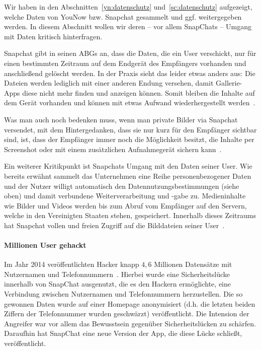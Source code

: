 Wir haben in den Abschnitten~\ref{yn:datenschutz} und~\ref{sc:datenschutz}
aufgezeigt, welche Daten von YouNow bzw. Snapchat gesammelt und ggf.
weitergegeben werden. In diesem Abschnitt wollen wir deren -- vor allem
SnapChats --  Umgang mit Daten kritisch hinterfragen.

Snapchat gibt in seinen ABGs an, dass die Daten, die ein User verschickt, nur
f\"ur einen bestimmten Zeitraum auf dem Endger\"at des Empf\"angers vorhanden
und anschlie{\ss}end gel\"oscht werden. In der Praxis sieht das leider etwas
anders aus: Die Dateien werden lediglich mit einer anderen Endung versehen,
damit Gallerie-Apps diese nicht mehr finden und anzeigen k\"onnen. Somit
bleiben die Inhalte auf dem Ger\"at vorhanden und k\"onnen mit etwas Aufwand
wiederhergestellt werden~\cite{sc_risiken}.

Was man auch noch bedenken muss, wenn man private Bilder via Snapchat
versendet, mit dem Hintergedanken, dass sie nur kurz f\"ur den Empf\"anger
sichtbar sind, ist, dass der Empf\"anger immer noch die M\"oglichkeit besitzt,
die Inhalte per Screenshot oder mit einem zus\"atzlichen Aufnahmeger\"at
sichern kann~\cite{sc_risiken}.

Ein weiterer Kritikpunkt ist Snapchats Umgang mit den Daten seiner User. Wie
bereits erw\"ahnt sammelt das Unternehmen eine Reihe personenbezogener Daten
und der Nutzer willigt automatisch den Datennutzungsbestimmungen (siehe oben)
und damit verbundene Weiterverarbeitung und -gabe zu. Medieninhalte wie Bilder
und Videos werden bis zum Abruf vom Empf\"anger auf den Servern, welche in den
Vereinigten Staaten stehen, gespeichert. Innerhalb dieses Zeitraums hat
Snapchat vollen und freien Zugriff auf die Bilddateien seiner
User~\cite{sc_risiken}.

\paragraph{Millionen User gehackt} Im Jahr 2014 ver\"offentlichten Hacker knapp
$4,6$ Millionen Datens\"atze mit Nutzernamen und Telefonnummern~\cite{sc_hack}.
Hierbei wurde eine Sicherheitsl\"ucke innerhalb von SnapChat ausgenutzt, die es
den Hackern erm\"oglichte, eine Verbindung zwischen Nutzernamen und
Telefonnummern herzustellen. Die so gewonnen Daten wurde auf einer Homepage
anonymisiert (d.h. die letzten beiden Ziffern der Telefonnummer wurden
geschw\"arzt) ver\"offentlicht. Die Intension der Angreifer war vor allem das
Bewusstsein gegen\"uber Sicherheitsl\"ucken zu sch\"arfen. Daraufhin hat
SnapChat eine neue Version der App, die diese L\"ucke schlie{\ss}t,
ver\"offentlicht.
